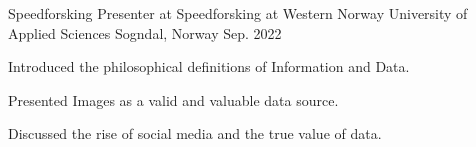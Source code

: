 

\begin{cventries}

  \cventry
    {Speedforsking} %
    {Presenter at Speedforsking at Western Norway University of Applied Sciences} %
    {Sogndal, Norway} %
    {Sep. 2022} %
    {
      \begin{cvitems} %
        \item {Introduced the philosophical definitions of Information and Data.}
        \item {Presented Images as a valid and valuable data source.}
        \item {Discussed the rise of social media and the true value of data.}
      \end{cvitems}
    }

\end{cventries}
